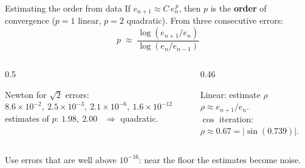 \documentclass[aspectratio=169]{beamer}
\begin{document}
\begin{frame}{Estimating the order from data}
\small
If $e_{n+1} \approx C\,e_n^{\,p}$, then $p$ is the \textbf{order} of convergence ($p=1$ linear, $p=2$ quadratic). From three consecutive errors:
\[
p \;\approx\; \frac{\log\left(e_{n+1}/e_n\right)}{\log\left(e_n/e_{n-1}\right)}
\]
\begin{columns}[T]
\begin{column}{0.5\textwidth}
\begin{exampleblock}{Newton for $\sqrt 2$}
errors: $8.6\!\times\!10^{-2},\ 2.5\!\times\!10^{-3},\ 2.1\!\times\!10^{-6},\ 1.6\!\times\!10^{-12}$\\[3pt]
estimates of $p$: $1.98,\ 2.00$ \ $\Rightarrow$ quadratic.
\end{exampleblock}
\end{column}
\begin{column}{0.46\textwidth}
\begin{block}{Linear: estimate $\rho$}
$\rho \approx e_{n+1}/e_n$.\\
$\cos$ iteration: $\rho \approx 0.67 = |\sin(0.739)|$.
\end{block}
\end{column}
\end{columns}
\vspace{0.2cm}
\scriptsize Use errors that are well above $10^{-16}$: near the floor the estimates become noise.
\end{frame}
\end{document}
